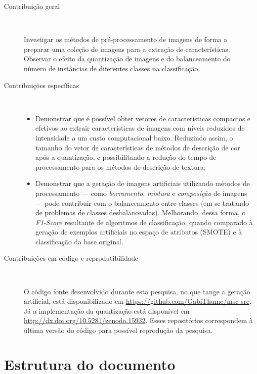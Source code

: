 \begin{description}
\item[Contribuição geral] \

Investigar os métodos de pré-processamento de imagens de forma a preparar uma coleção de imagens para a extração de características. Observar o efeito da quantização de imagens e do balanceamento do número de instâncias de diferentes classes na classificação.

\item[Contribuições específicas] \

  \begin{itemize}

    \item Demonstrar que é possível obter vetores de características compactos e efetivos ao extrair características de imagens com níveis reduzidos de intensidade a um custo computacional baixo. Reduzindo assim, o tamanho do vetor de características de métodos de descrição de cor após a quantização, e possibilitando a redução do tempo de processamento para os métodos de descrição de textura;

    \item Demonstrar que a geração de imagens artificiais utilizando métodos de processamento --- como \emph{borramento}, \emph{mistura} e \emph{composição} de imagens --- pode contribuir com o balanceamento entre classes (em se tratando de problemas de classes desbalanceadas). Melhorando, dessa forma, o \textit{F1-Score} resultante de algoritmos de classificação, quando comparado à geração de exemplos artificiais no espaço de atributos (SMOTE) e à classificação da base original.

  \end{itemize}


\item[Contribuições em código e reprodutibilidade] \

O código fonte desenvolvido durante esta pesquisa, no que tange a geração artificial, está disponibilizado em \url{https://github.com/GabiThume/msc-src}. Já a implementação da quantização está disponível em \url{http://dx.doi.org/10.5281/zenodo.15932}. Esses repositórios correspondem à última versão do código para possível reprodução da pesquisa.

\end{description}

\section{Estrutura do documento}

